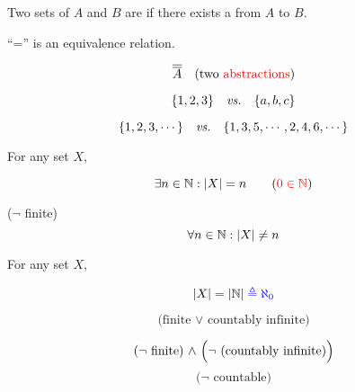 \begin{frame}{}
\end{frame}

\begin{frame}{}
  \begin{definition}[$|A| = |B| \;(A \approx B)$ (1878)]
    Two sets of $A$ and $B$ are  if there exists a  from $A$ to $B$.
  \end{definition}

  \pause
  \vspace{0.60cm}
  \centerline{``='' is an equivalence relation.}

  \pause
  \[
    \overline{\overline{A}} \quad \text{(two \textcolor{red}{abstractions})}
  \]

  \pause
  \[
    \{1,2,3\} \quad \text{\it vs.} \quad \{a,b,c\}
  \]

  \pause
  \[
    \{1,2,3,\cdots\} \quad \text{\it vs.} \quad \{1,3,5,\cdots, 2,4,6,\cdots\}
  \]
\end{frame}

\begin{frame}{}
  \begin{definition}
    For any set $X$,
    \begin{description}[Infinite]
      \item[Finite] 
	\[
	  \exists n \in \mathbb{N}: |X| = n  \qquad (\textcolor{red}{0 \in \mathbb{N}})
	\]
      \item[Infinite] ($\lnot$ finite)
	\[
	  \forall n \in \mathbb{N}: |X| \neq n
	\]
    \end{description}
  \end{definition}

\end{frame}

\begin{frame}{}
  \begin{definition}
    For any set $X$,
    \begin{description}
      \item[Countably Infinite]
	\[
	  |X| = |\mathbb{N}| \textcolor{blue}{\;\triangleq \aleph_{0}}
	\]
      \item[Countable]
	\[
	  \text{(finite $\lor$ countably infinite)}
	\]
      \item[Uncountably Infinite] 
	\[
	  \text{($\lnot$ finite) $\land$ \Big($\lnot$ (countably infinite)\Big)}
	\]
	\[
	  \text{($\lnot$ countable)}
	\]
    \end{description}
  \end{definition}
\end{frame}

